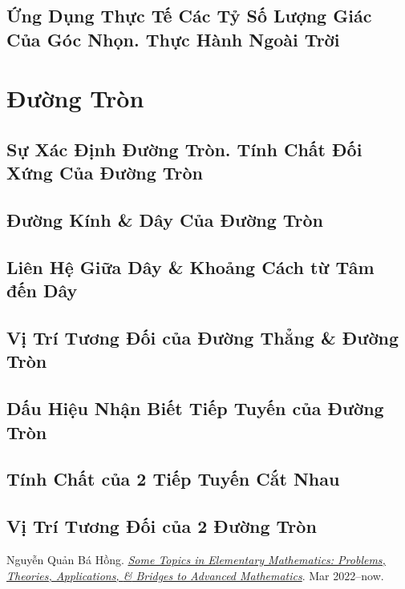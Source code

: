 \documentclass{article}
\numberwithin{equation}{section}
\begin{document}
\subsection{Ứng Dụng Thực Tế Các Tỷ Số Lượng Giác Của Góc Nhọn. Thực Hành Ngoài Trời}

\section{Đường Tròn}

\subsection{Sự Xác Định Đường Tròn. Tính Chất Đối Xứng Của Đường Tròn}

\subsection{Đường Kính \& Dây Của Đường Tròn}

\subsection{Liên Hệ Giữa Dây \& Khoảng Cách từ Tâm đến Dây}

\subsection{Vị Trí Tương Đối của Đường Thẳng \& Đường Tròn}

\subsection{Dấu Hiệu Nhận Biết Tiếp Tuyến của Đường Tròn}

\subsection{Tính Chất của 2 Tiếp Tuyến Cắt Nhau}

\subsection{Vị Trí Tương Đối của 2 Đường Tròn}


\begin{thebibliography}{99}
	 Nguyễn Quản Bá Hồng. \href{https://github.com/NQBH/hobby/blob/master/elementary_mathematics/NQBH_elementary_mathematics.pdf}{\textit{Some Topics in Elementary Mathematics: Problems, Theories, Applications, \textit{\&} Bridges to Advanced Mathematics}}. Mar 2022--now.
\end{thebibliography}


\printbibliography[heading=bibintoc]
	
\end{document}
